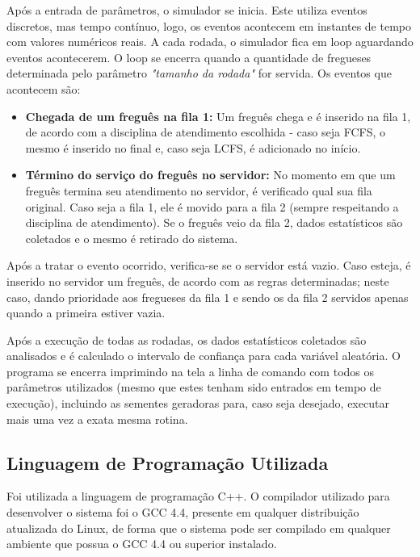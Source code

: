 \documentclass[a4paper,10pt]{article}
\begin{document}
    Após a entrada de parâmetros, o simulador se inicia. Este utiliza eventos discretos, mas tempo contínuo, logo, os eventos acontecem em instantes de tempo com valores numéricos reais. A cada rodada, o simulador fica em loop aguardando eventos acontecerem. O loop se encerra quando a quantidade de fregueses determinada pelo parâmetro \emph{"tamanho da rodada"} for servida. Os eventos que acontecem são:

\begin {itemize}
\item \textbf{Chegada de um freguês na fila 1:} Um freguês chega e é inserido na fila 1, de acordo com a disciplina de atendimento escolhida - caso seja FCFS, o mesmo é inserido no final e, caso seja LCFS, é adicionado no início.

\item \textbf{Término do serviço do freguês no servidor:} No momento em que um freguês termina seu atendimento no servidor, é verificado qual sua fila original. Caso seja a fila 1,
ele é movido para a fila 2 (sempre respeitando a disciplina de atendimento). Se o freguês veio da fila 2, dados estatísticos são coletados e o mesmo é retirado do sistema.
\end {itemize}

    Após a tratar o evento ocorrido, verifica-se se o servidor está vazio. Caso esteja, é inserido no servidor um freguês, de acordo com as regras determinadas; neste caso, dando prioridade aos fregueses da fila 1 e sendo os da fila 2 servidos apenas quando a primeira estiver vazia.

    Após a execução de todas as rodadas, os dados estatísticos coletados são analisados e é calculado o intervalo de confiança para cada variável aleatória. O programa se encerra imprimindo na tela a linha de comando com todos os parâmetros utilizados (mesmo que estes tenham sido entrados em tempo de execução), incluindo as sementes geradoras para, caso seja desejado, executar mais uma vez a exata mesma rotina.

\subsection{Linguagem de Programação Utilizada}

    Foi utilizada a linguagem de programação C++. O compilador utilizado para desenvolver o sistema foi o GCC 4.4, presente em qualquer distribuição atualizada do Linux, de forma que o sistema pode ser compilado em qualquer ambiente que possua o GCC 4.4 ou superior instalado.
\end{document}
